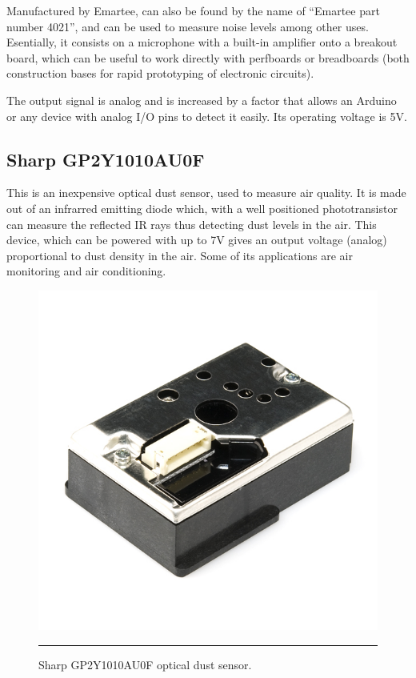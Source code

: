 Manufactured by Emartee, can also be found by the name of ``Emartee part number 4021'', and can be used to measure noise levels among other uses. Esentially, it consists on a microphone with a built-in amplifier onto a breakout board, which can be useful to work directly with perfboards or breadboards (both construction bases for rapid prototyping of electronic circuits).

The output signal is analog and is increased by a factor that allows an Arduino or any device with analog I/O pins to detect it easily\citep{gertz2012environmental}. Its operating voltage is 5V.



\subsection{Sharp GP2Y1010AU0F}
\label{sub:sharp}

This is an inexpensive optical dust sensor, used to measure air quality. It is made out of an infrarred emitting diode which, with a well positioned phototransistor can measure the reflected IR rays thus detecting dust levels in the air\citep{sharp}. This device, which can be powered with up to 7V gives an output voltage (analog) proportional to dust density in the air. Some of its applications are air monitoring and air conditioning.

\begin{figure}[htbp]
    \centering
        \includegraphics{./Figures/sharp.jpg}
        \rule{35em}{0.5pt}
    \caption[Sharp GP2Y1010AU0F]{Sharp GP2Y1010AU0F optical dust sensor.}
    \label{fig:SharpGP2Y1010AU0F}
\end{figure}

